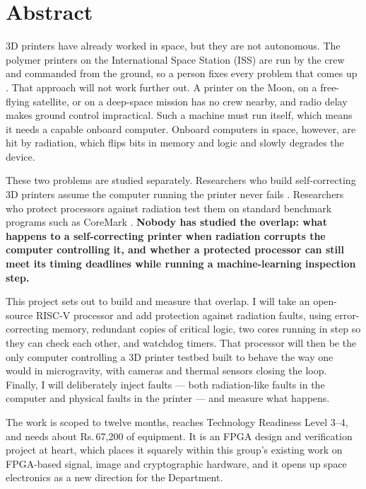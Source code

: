 \documentclass[11pt,a4paper]{article}
\newcommand{\rupee}{\textrm{Rs.}}
\begin{document}
\tableofcontents
\newpage

\section{Abstract}

3D printers have already worked in space, but they are not autonomous. The
polymer printers on the International Space Station (ISS) are run by the crew and
commanded from the ground, so a person fixes every problem that comes up
\cite{issnl_amf,prater2019zerog}. That approach will not work further out. A
printer on the Moon, on a free-flying satellite, or on a deep-space mission has
no crew nearby, and radio delay makes ground control impractical. Such a machine
must run itself, which means it needs a capable onboard computer. Onboard
computers in space, however, are hit by radiation, which flips bits in memory and
logic and slowly degrades the device.

These two problems are studied separately. Researchers who build self-correcting
3D printers assume the computer running the printer never fails
\cite{fff_monitoring_review,saluja2020warping}. Researchers who protect processors
against radiation test them on standard benchmark programs such as CoreMark
\cite{wilson2019neutron,electronics2023faultawareness,dimascio2021opensource}.
\textbf{Nobody has studied the overlap: what happens to a self-correcting printer
when radiation corrupts the computer controlling it, and whether a protected
processor can still meet its timing deadlines while running a machine-learning
inspection step.}

This project sets out to build and measure that overlap. I will take an
open-source RISC-V processor and add protection against radiation faults, using
error-correcting memory, redundant copies of critical logic, two cores running in
step so they can check each other, and watchdog timers. That processor will then
be the only computer controlling a 3D printer testbed built to behave the way one
would in microgravity, with cameras and thermal sensors closing the loop.
Finally, I will deliberately inject faults --- both radiation-like faults in the
computer and physical faults in the printer --- and measure what happens.

The work is scoped to twelve months, reaches Technology Readiness Level 3--4, and
needs about \rupee\,67{,}200 of equipment. It is an FPGA design and verification
project at heart, which places it squarely within this group's existing work on
FPGA-based signal, image and cryptographic hardware, and it opens up space
electronics as a new direction for the Department.
\end{document}
